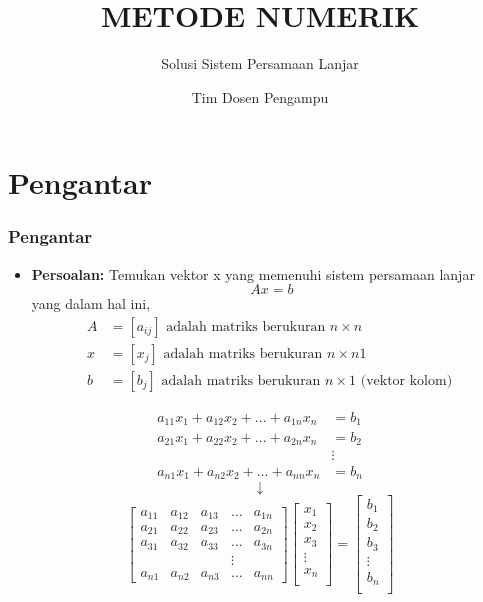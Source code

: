 \documentclass[pdflatex,compress,mathserif]{beamer}
\title{METODE NUMERIK}
\subtitle{Solusi Sistem Persamaan Lanjar}
\author{Tim Dosen Pengampu}
\begin{document}
	
\maketitle

\section{Pengantar}

\begin{frame}
	\frametitle{Pengantar}
	\begin{itemize}
		\item \textbf{Persoalan:} Temukan vektor x yang memenuhi sistem persamaan lanjar \[ Ax = b \] yang dalam hal ini,
		\begin{align*}
			A &= [a_{ij}] \text{ adalah matriks berukuran } n \times n\\
			x &= [x_{j}]  \text{ adalah matriks berukuran } n \times n1 \\
			b &= [b_{j}]  \text{ adalah matriks berukuran } n \times 1 \text{ (vektor kolom) }
		\end{align*}
	\end{itemize}
\end{frame}

\begin{frame}[t]
	\[
	\begin{matrix}
	a_{11}x_1 + a_{12}x_2 + \dots + a_{1n}x_n &= b_1 \\
	a_{21}x_1 + a_{22}x_2 + \dots + a_{2n}x_n &= b_2 \\
	&\vdots\\
	a_{n1}x_1 + a_{n2}x_2 + \dots + a_{nn}x_n &= b_n
	\end{matrix}
	\]
	\[\downarrow\]
	\[
	\begin{bmatrix}
		a_{11} & a_{12} & a_{13} & \dots & a_{1n} \\
		a_{21} & a_{22} & a_{23} & \dots & a_{2n} \\
		a_{31} & a_{32} & a_{33} & \dots & a_{3n} \\
		& & & \vdots &  \\
		a_{n1} & a_{n2} & a_{n3} & \dots & a_{nn}
	\end{bmatrix}
	\begin{bmatrix}
		x_1 \\
		x_2 \\
		x_3 \\
		\vdots\\
		x_n \\
	\end{bmatrix}
	=
	\begin{bmatrix}
		b_1 \\
		b_2 \\
		b_3 \\
		\vdots\\
		b_n \\
	\end{bmatrix}
	\]
\end{frame}
\end{document}
